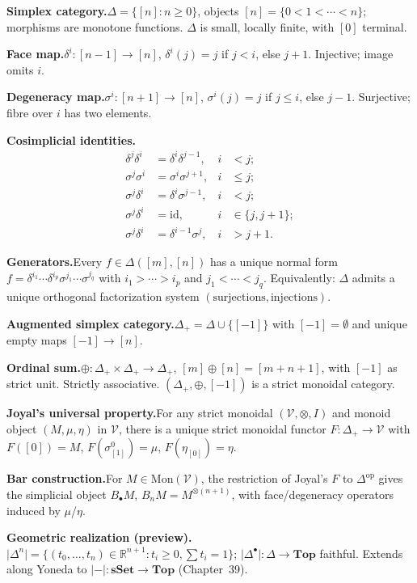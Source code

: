 \begin{formalrestatement}
\textbf{Simplex category.}\quad $\Delta = \{[n] : n \geq 0\}$, objects
$[n] = \{0 < 1 < \cdots < n\}$; morphisms are monotone functions.
$\Delta$ is small, locally finite, with $[0]$ terminal.

\medskip
\textbf{Face map.}\quad $\delta^i : [n-1] \to [n]$, $\delta^i(j) = j$ if
$j < i$, else $j+1$. Injective; image omits $i$.

\medskip
\textbf{Degeneracy map.}\quad $\sigma^i : [n+1] \to [n]$, $\sigma^i(j) = j$
if $j \leq i$, else $j-1$. Surjective; fibre over $i$ has two elements.

\medskip
\textbf{Cosimplicial identities.}\quad
\begin{align*}
  \delta^j \delta^i &= \delta^i \delta^{j-1}, & i &< j; \\
  \sigma^j \sigma^i &= \sigma^i \sigma^{j+1}, & i &\leq j; \\
  \sigma^j \delta^i &= \delta^i \sigma^{j-1}, & i &< j; \\
  \sigma^j \delta^i &= \mathrm{id},           & i &\in \{j, j+1\}; \\
  \sigma^j \delta^i &= \delta^{i-1} \sigma^j, & i &> j+1.
\end{align*}

\medskip
\textbf{Generators.}\quad Every $f \in \Delta([m], [n])$ has a unique
normal form $f = \delta^{i_1} \cdots \delta^{i_p} \sigma^{j_1} \cdots
\sigma^{j_q}$ with $i_1 > \cdots > i_p$ and $j_1 < \cdots < j_q$.
Equivalently: $\Delta$ admits a unique orthogonal factorization system
$(\text{surjections}, \text{injections})$.

\medskip
\textbf{Augmented simplex category.}\quad $\Delta_+ = \Delta \cup \{[-1]\}$
with $[-1] = \emptyset$ and unique empty maps $[-1] \to [n]$.

\medskip
\textbf{Ordinal sum.}\quad $\oplus : \Delta_+ \times \Delta_+ \to \Delta_+$,
$[m] \oplus [n] = [m+n+1]$, with $[-1]$ as strict unit. Strictly
associative. $(\Delta_+, \oplus, [-1])$ is a strict monoidal category.

\medskip
\textbf{Joyal's universal property.}\quad For any strict monoidal
$(\mathcal{V}, \otimes, I)$ and monoid object $(M, \mu, \eta)$ in
$\mathcal{V}$, there is a unique strict monoidal functor $F : \Delta_+
\to \mathcal{V}$ with $F([0]) = M$, $F(\sigma^0_{[1]}) = \mu$,
$F(\eta_{[0]}) = \eta$.

\medskip
\textbf{Bar construction.}\quad For $M \in \mathrm{Mon}(\mathcal{V})$,
the restriction of Joyal's $F$ to $\Delta^{\mathrm{op}}$ gives the
simplicial object $B_\bullet M$, $B_n M = M^{\otimes(n+1)}$, with
face/degeneracy operators induced by $\mu$/$\eta$.

\medskip
\textbf{Geometric realization (preview).}\quad $\lvert\Delta^n\rvert =
\{(t_0, \ldots, t_n) \in \mathbb{R}^{n+1} : t_i \geq 0, \sum t_i = 1\}$;
$\lvert\Delta^\bullet\rvert : \Delta \to \mathbf{Top}$ faithful. Extends
along Yoneda to $\lvert{-}\rvert : \mathbf{sSet} \to \mathbf{Top}$
(Chapter~39).
\end{formalrestatement}
